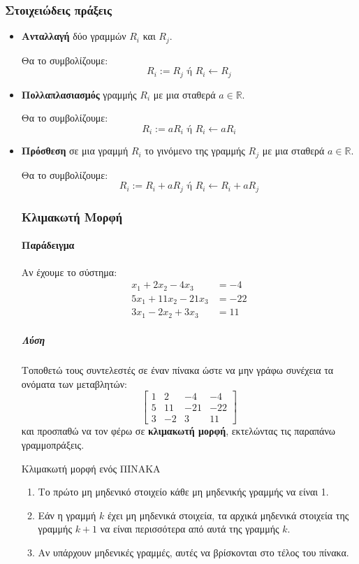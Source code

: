 \documentclass[11pt,a4paper,notitlepage,fleqn]{article}
\begin{document}
\subsubsection{Στοιχειώδεις πράξεις}
\begin{itemize}
	\item \textbf{Ανταλλαγή} δύο γραμμών \( R_i \) και \( R_j \).
	
	Θα το συμβολίζουμε:
	\[
	R_i := R_j \text{ ή } R_i \leftarrow R_j
	\]
	\item \textbf{Πολλαπλασιασμός} γραμμής \( R_i \) με μια σταθερά
	\( a\in
	\mathbb R  \).
	
	Θα το συμβολίζουμε:
	\[
	R_i := aR_i \text{ ή } R_i \leftarrow aR_i
	\]
	
	\item \textbf{Πρόσθεση} σε μια γραμμή \( R_i \) το γινόμενο της
	γραμμής
	\( R_j \) με μια σταθερά \( a \in \mathbb R  \).
	
	Θα το συμβολίζουμε:
	\[
	R_i := R_i + aR_j \text{ ή } R_i \leftarrow R_i + aR_j
	\]
	
	\subsubsection{Κλιμακωτή Μορφή}
	
	\paragraph{Παράδειγμα}
	Αν έχουμε το σύστημα:
	\begin{align*}
		x_1+2x_2-4x_3 &= -4 \\
		5x_1+11x_2-21x_3 &= -22 \\
		3x_1 - 2x_2 + 3x_3 &= 11
	\end{align*}
	\subparagraph{Λύση}
	Τοποθετώ τους συντελεστές σε έναν πίνακα ώστε να μην γράφω συνέχεια
	τα ονόματα των μεταβλητών:
	\[
	\left[\begin{array}{ccc|c}
	1 & 2 & -4 & -4 \\ 5 & 11 & -21 & -22 \\ 3 & -2 & 3 & 11
	\end{array}\right]
	\]
	και προσπαθώ να τον φέρω σε \textbf{κλιμακωτή μορφή},
	εκτελώντας τις παραπάνω γραμμοπράξεις.
	
	\begin{defn}{Κλιμακωτή μορφή ενός ΠΙΝΑΚΑ}{}
		\begin{enumerate}
			\item Το πρώτο μη μηδενικό στοιχείο κάθε μη μηδενικής γραμμής
			να είναι 1.
			\item Εάν η γραμμή \( k \) έχει μη μηδενικά στοιχεία, τα
			αρχικά μηδενικά στοιχεία της γραμμής \( k+1 \) να είναι
			περισσότερα από αυτά της γραμμής \( k \).
			\item Αν υπάρχουν μηδενικές γραμμές, αυτές να βρίσκονται στο
			τέλος του πίνακα.
		\end{enumerate}
		\tcblower

\end{defn}
\end{itemize}
\end{document}
